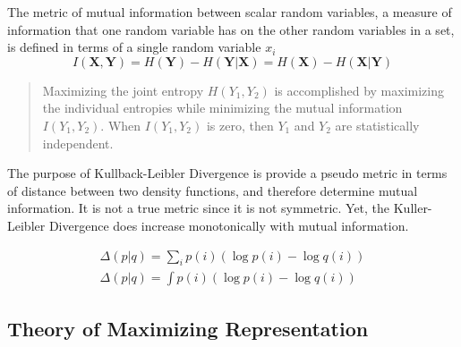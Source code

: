 \documentclass[12pt ]{article}
\begin{document}
The metric of mutual information between scalar random variables, a measure of information that one random variable has on the other random variables in a set, is defined in terms of a single random variable $x_i$  
\begin{equation}
I(\mathbf{X},\mathbf{Y})  = H(\mathbf{Y}) - H(\mathbf{Y}|\mathbf{X}) = H(\mathbf{X}) - H(\mathbf{X}|\mathbf{Y})
\end{equation}
\begin{quote}
Maximizing the joint entropy $H(Y_1, Y_2)$ is accomplished by maximizing the individual entropies while minimizing the mutual information $I(Y_1, Y_2)$.  When $I(Y_1, Y_2)$ is zero, then $Y_1$ and $Y_2$ are statistically independent.
\cite[662]{moon-stirling-book}
\end{quote}


The purpose of Kullback-Leibler Divergence is provide a pseudo metric in terms of distance  between two density functions, and therefore determine mutual information.   It is not a true metric since it is not symmetric.   Yet, the Kuller-Leibler Divergence does increase monotonically with mutual information.  

\begin{eqnarray}
\Delta(p| q) = \sum _i p(i) (\log p(i) - \log q(i)) \\
\Delta(p| q) = \int p(i) (\log p(i) - \log q(i)) 
\end{eqnarray}


\subsection{Theory of Maximizing Representation}\label{maximizing-represnetation}
\end{document}
